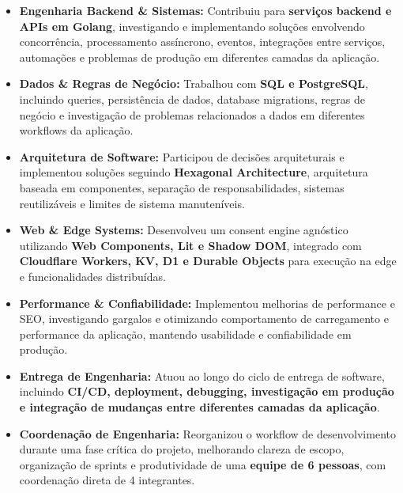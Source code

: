 \documentclass[10pt,a4paper]{article}
\begin{document}
\begin{itemize}
    \item
    \textbf{Engenharia Backend \& Sistemas:}
    Contribuiu para \textbf{serviços backend e APIs em Golang},
    investigando e implementando soluções envolvendo
    concorrência, processamento assíncrono, eventos, integrações
    entre serviços, automações e problemas de produção em
    diferentes camadas da aplicação.

    \item
    \textbf{Dados \& Regras de Negócio:}
    Trabalhou com \textbf{SQL e PostgreSQL}, incluindo queries,
    persistência de dados, database migrations, regras de negócio
    e investigação de problemas relacionados a dados em
    diferentes workflows da aplicação.

    \item
    \textbf{Arquitetura de Software:}
    Participou de decisões arquiteturais e implementou soluções
    seguindo \textbf{Hexagonal Architecture}, arquitetura baseada
    em componentes, separação de responsabilidades, sistemas
    reutilizáveis e limites de sistema manuteníveis.

    \item
    \textbf{Web \& Edge Systems:}
    Desenvolveu um consent engine agnóstico utilizando
    \textbf{Web Components, Lit e Shadow DOM}, integrado com
    \textbf{Cloudflare Workers, KV, D1 e Durable Objects}
    para execução na edge e funcionalidades distribuídas.

    \item
    \textbf{Performance \& Confiabilidade:}
    Implementou melhorias de performance e SEO, investigando
    gargalos e otimizando comportamento de carregamento e
    performance da aplicação, mantendo usabilidade e
    confiabilidade em produção.

    \item
    \textbf{Entrega de Engenharia:}
    Atuou ao longo do ciclo de entrega de software, incluindo
    \textbf{CI/CD, deployment, debugging, investigação em
    produção e integração de mudanças entre diferentes camadas
    da aplicação}.

    \item
    \textbf{Coordenação de Engenharia:}
    Reorganizou o workflow de desenvolvimento durante uma fase
    crítica do projeto, melhorando clareza de escopo, organização
    de sprints e produtividade de uma \textbf{equipe de 6 pessoas},
    com coordenação direta de 4 integrantes.

\end{itemize}
\end{document}

